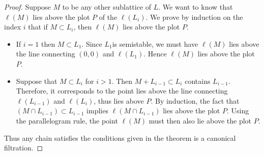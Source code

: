 \begin{proof}
    Suppose $M$ to be any other sublattice of $L$. We want to know that $\ell(M)$ lies
    above the plot $P$ of the $\ell(L_i)$. We prove by induction on the index $i$ that if $M \subset L_i$, then $\ell(M)$ lies above the
    plot $P$.
    \begin{itemize}
        \item If $i=1$ then $M\subset L_1$. Since $L_1 $is semistable, we must have $\ell(M)$ lies above the line connecting $(0,0)$ and $\ell(L_1)$. Hence $\ell(M)$ lies above the plot $P$.
        \item Suppose that $M\subset L_i$ for $i>1$. Then $M+L_{i-1} \subset L_i$ contains $L_{i-1}$. Therefore, it corresponds to the point lies above the line connecting $\ell(L_{i-1})$ and $\ell(L_i)$, thus lies above $P$.         By induction, the fact that $(M\cap L_{i-1}) \subset L_{i-1}$ implies $\ell(M\cap L_{i-1})$ lies above the plot $P$. Using the parallelogram rule, the point $\ell(M)$ must then also lie above the plot $P$.
    \end{itemize}
    Thus any chain satisfies the conditions given in the theorem is a canonical filtration.
\end{proof}
